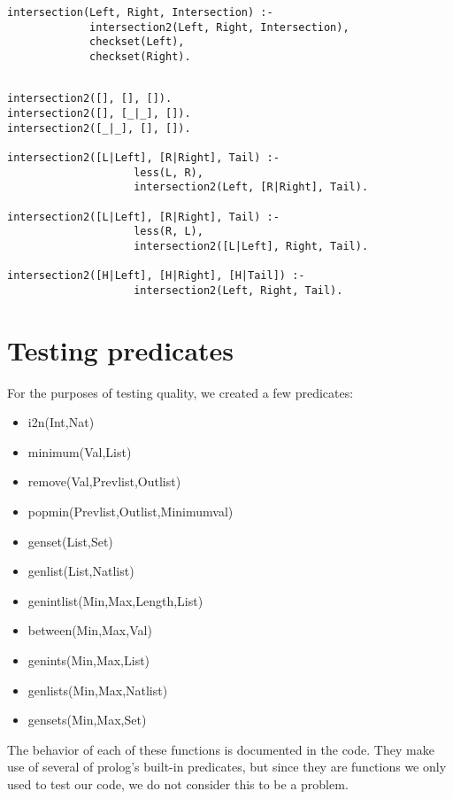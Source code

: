 \documentclass{article}
\begin{document}
\lstset{language=Prolog, frame=lines} \begin{lstlisting}[caption={intersection/3 definition}]
intersection(Left, Right, Intersection) :- 
             intersection2(Left, Right, Intersection), 
             checkset(Left), 
             checkset(Right).
    
\end{lstlisting}
\lstset{language=Prolog, frame=lines} \begin{lstlisting}[caption={intersection2/3 definition}]
intersection2([], [], []).
intersection2([], [_|_], []).
intersection2([_|_], [], []).

intersection2([L|Left], [R|Right], Tail) :- 
                    less(L, R), 
                    intersection2(Left, [R|Right], Tail).
                
intersection2([L|Left], [R|Right], Tail) :- 
                    less(R, L),
                    intersection2([L|Left], Right, Tail).
                    
intersection2([H|Left], [H|Right], [H|Tail]) :-
                    intersection2(Left, Right, Tail).
\end{lstlisting}

\section{Testing predicates}
For the purposes of testing quality, we created a few predicates:

\begin{itemize}

    \item i2n(Int,Nat)

    \item minimum(Val,List)

    \item remove(Val,Prevlist,Outlist)

    \item popmin(Prevlist,Outlist,Minimumval)

    \item genset(List,Set)

    \item genlist(List,Natlist)

    \item genintlist(Min,Max,Length,List)

    \item between(Min,Max,Val)

    \item genints(Min,Max,List)

    \item genlists(Min,Max,Natlist)

    \item gensets(Min,Max,Set)
\end{itemize}


The behavior of each of these functions is documented in the code. They make use of several of prolog's built-in predicates, but since they are functions we only used to test our code, we do not consider this to be a problem.
\end{document}
